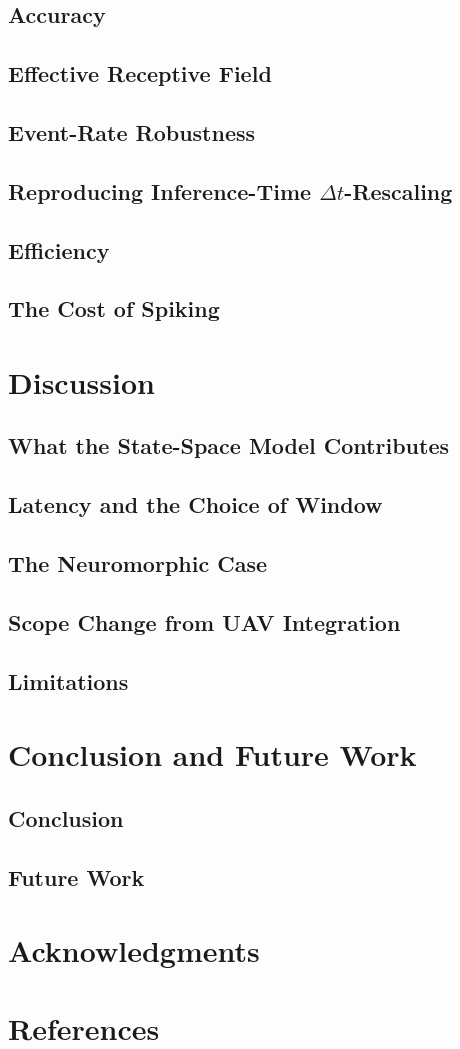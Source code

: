 \documentclass[11pt,a4paper]{article}
\begin{document}
\subsection{Accuracy}
\subsection{Effective Receptive Field}
\subsection{Event-Rate Robustness}
\subsection{Reproducing Inference-Time \texorpdfstring{$\Delta t$}{Delta t}-Rescaling}
\subsection{Efficiency}
\subsection{The Cost of Spiking}

\section{Discussion}
\subsection{What the State-Space Model Contributes}
\subsection{Latency and the Choice of Window}
\subsection{The Neuromorphic Case}
\subsection{Scope Change from UAV Integration}
\subsection{Limitations}

\section{Conclusion and Future Work}
\subsection{Conclusion}
\subsection{Future Work}

\section*{Acknowledgments}

\section*{References}
\end{document}
